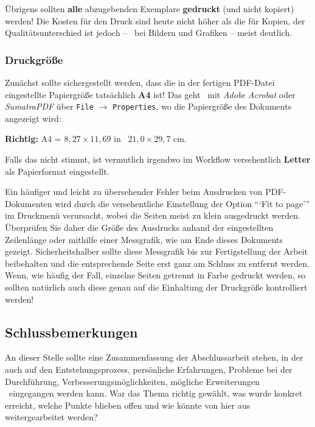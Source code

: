 Übrigens sollten \textbf{alle} abzugebenden Exemplare \textbf{gedruckt}
(und nicht kopiert) werden! Die Kosten für den Druck sind heute nicht
höher als die für Kopien, der Qualitätsunterschied ist jedoch -- \va~bei
Bildern und Grafiken -- meist deutlich.

\hypertarget{druckgruxf6uxdfe}{%
\subsubsection{Druckgröße}\label{druckgruxf6uxdfe}}

Zunächst sollte sichergestellt werden, dass die in der fertigen
PDF-Datei eingestellte Papiergröße tatsächlich \textbf{A4} ist! Das geht
\zB~mit \emph{Adobe Acrobat} oder \emph{SumatraPDF} über
\passthrough{\lstinline!File!} \(\rightarrow\)
\passthrough{\lstinline!Properties!}, wo die Papiergröße des Dokuments
angezeigt wird:

\begin{center}
\textbf{Richtig:} A4 = $8{,}27 \times 11{,}69$ in \bzw\ $21{,}0 \times 29{,}7$ cm.
\end{center}

Falls das nicht stimmt, ist vermutlich irgendwo im Workflow
versehentlich \textbf{Letter} als Papierformat eingestellt.

Ein häufiger und leicht zu übersehender Fehler beim Ausdrucken von
PDF-Dokumenten wird durch die versehentliche Einstellung der Option
```Fit to page''' im Druckmenü verursacht, wobei die Seiten meist zu
klein ausgedruckt werden. Überprüfen Sie daher die Größe des Ausdrucks
anhand der eingestellten Zeilenlänge oder mithilfe einer Messgrafik, wie
am Ende dieses Dokuments gezeigt. Sicherheitshalber sollte diese
Messgrafik bis zur Fertigstellung der Arbeit beibehalten und die
entsprechende Seite erst ganz am Schluss zu entfernt werden. Wenn, wie
häufig der Fall, einzelne Seiten getrennt in Farbe gedruckt werden, so
sollten natürlich auch diese genau auf die Einhaltung der Druckgröße
kontrolliert werden!

\hypertarget{schlussbemerkungen}{%
\subsection{Schlussbemerkungen}\label{schlussbemerkungen}}

An dieser Stelle sollte eine Zusammenfassung der Abschlussarbeit stehen,
in der auch auf den Entstehungsprozess, persönliche Erfahrungen,
Probleme bei der Durchführung, Verbesserungsmöglichkeiten, mögliche
Erweiterungen \usw~eingegangen werden kann. War das Thema richtig
gewählt, was wurde konkret erreicht, welche Punkte blieben offen und wie
könnte von hier aus weitergearbeitet werden?

